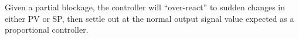 Given a partial blockage, the controller will ``over-react'' to sudden changes in either PV or SP, then settle out at the normal output signal value expected as a proportional controller.












